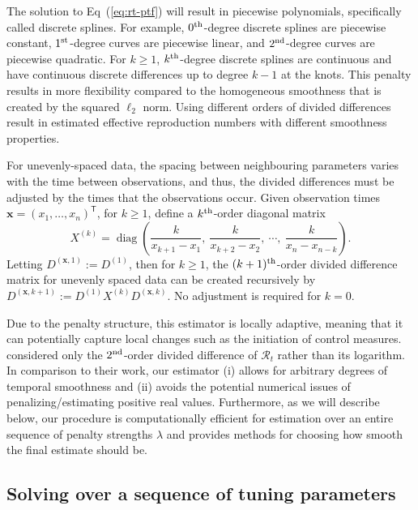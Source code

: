 \documentclass[10pt,letterpaper]{article}
\newcommand{\lr}[1]{\left(#1\right)}
\DeclareMathOperator*{\diag}{diag}
\def\bfx{\mathbf{x}}
\def\calR{\mathcal{R}}
\renewcommand{\top}{\mathsf{T}}
\def\th{^{\textnormal{th}}}
\def\first{$1^{\textnormal{st}}$}
\def\second{$2^{\textnormal{nd}}$}
\renewcommand{\eqref}[1]{Eq~(\ref{#1})}
\begin{document}
The solution to \eqref{eq:rt-ptf} will result in piecewise
polynomials, specifically called discrete splines. For example, $0\th$-degree
discrete splines are piecewise constant, \first-degree curves are piecewise
linear, and \second-degree curves are piecewise quadratic. For $k\geq 1$,
$k\th$-degree discrete splines are continuous and have continuous discrete
differences up to degree $k-1$ at the knots. This penalty results in more
flexibility compared to the homogeneous smoothness that is created by the
squared $\ell_2$ norm. Using different orders of divided differences result in
estimated effective reproduction numbers with different smoothness properties. 



For unevenly-spaced data, the spacing between neighbouring parameters
varies with the time between observations, and thus, the divided differences
must be adjusted by the times that the observations occur. Given observation
times $\bfx = {(x_1,\dots,x_n)}^\top$, for $k \geq 1$, define a $k\th$-order
diagonal matrix 
\begin{equation}
  X^{(k)} = \diag \lr{\frac{k}{x_{k+1} - x_1},\ \frac{k}{x_{k+2} - x_2},\ 
  \cdots,\ \frac{k}{x_n - x_{n-k}} }.
\end{equation}
Letting $D^{(\bfx,1)} := D^{(1)}$,
then for $k\geq 1$, the $(k+1)\th$-order divided difference matrix for unevenly
spaced data can be created recursively by
$D^{(\bfx, k+1)} := D^{(1)} X^{(k)} D^{(\bfx,k)}.$ No adjustment is required
for $k=0$. 


Due to the penalty structure, this estimator is locally adaptive,
meaning that it can potentially capture local changes such as the initiation of
control measures. \cite{abry2020spatial,pascal2022nonsmooth} considered only the
\second-order divided difference of $\calR_t$ rather than its logarithm. In
comparison to their work, our estimator (i) allows for arbitrary degrees of
temporal smoothness and (ii) avoids the potential numerical issues of
penalizing/estimating positive real values. Furthermore, as we will describe
below, our procedure is computationally efficient for estimation over an entire
sequence of penalty strengths $\lambda$ and provides methods for choosing how
smooth the final estimate should be.


\subsection{Solving over a sequence of tuning parameters}
\label{sec:candidate-set}
\end{document}

